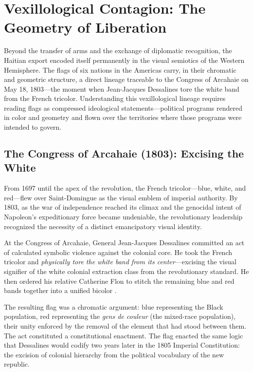 \section{Vexillological Contagion: The Geometry of Liberation}
\label{sec:vexillological_contagion}

Beyond the transfer of arms and the exchange of diplomatic recognition, the Haitian export encoded itself permanently in the visual semiotics of the Western Hemisphere. The flags of six nations in the Americas carry, in their chromatic and geometric structure, a direct lineage traceable to the Congress of Arcahaie on May 18, 1803---the moment when Jean-Jacques Dessalines tore the white band from the French tricolor. Understanding this vexillological lineage requires reading flags as compressed ideological statements---political programs rendered in color and geometry and flown over the territories where those programs were intended to govern.

\subsection{The Congress of Arcahaie (1803): Excising the White}

From 1697 until the apex of the revolution, the French tricolor---blue, white, and red---flew over Saint-Domingue as the visual emblem of imperial authority. By 1803, as the war of independence reached its climax and the genocidal intent of Napoleon's expeditionary force became undeniable, the revolutionary leadership recognized the necessity of a distinct emancipatory visual identity.

\begin{historicalsource}
At the Congress of Arcahaie, General Jean-Jacques Dessalines committed an act of calculated symbolic violence against the colonial core. He took the French tricolor and \textit{physically tore the white band from its center}---excising the visual signifier of the white colonial extraction class from the revolutionary standard. He then ordered his relative Catherine Flon to stitch the remaining blue and red bands together into a unified bicolor \cite{haiti_constitution_1805}.

The resulting flag was a chromatic argument: blue representing the Black population, red representing the \textit{gens de couleur} (the mixed-race population), their unity enforced by the removal of the element that had stood between them. The act constituted a constitutional enactment. The flag enacted the same logic that Dessalines would codify two years later in the 1805 Imperial Constitution: the excision of colonial hierarchy from the political vocabulary of the new republic.
\end{historicalsource}

